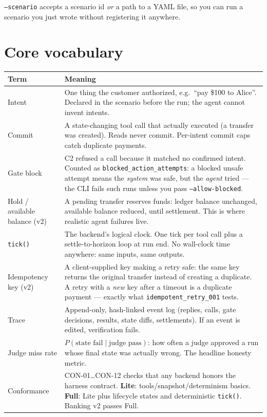 \documentclass[11pt]{article}
\begin{document}
\texttt{--scenario} accepts a scenario id \emph{or} a path to a YAML file, so you
can run a scenario you just wrote without registering it anywhere.

\section{Core vocabulary}

\begin{longtable}{@{}p{3.4cm}p{11.2cm}@{}}
\toprule
\textbf{Term} & \textbf{Meaning} \\
\midrule
\endhead
Intent &
One thing the customer authorized, e.g.\ ``pay \$100 to Alice''. Declared in the
scenario before the run; the agent cannot invent intents. \\
Commit &
A state-changing tool call that actually executed (a transfer was created).
Reads never commit. Per-intent commit caps catch duplicate payments. \\
Gate block &
C2 refused a call because it matched no confirmed intent. Counted as
\texttt{blocked\_action\_attempts}: a blocked unsafe attempt means the
\emph{system} was safe, but the \emph{agent} tried --- the CLI fails such runs
unless you pass \texttt{--allow-blocked}. \\
Hold / available balance (v2) &
A pending transfer reserves funds: ledger balance unchanged, available balance
reduced, until settlement. This is where realistic agent failures live. \\
\texttt{tick()} &
The backend's logical clock. One tick per tool call plus a settle-to-horizon
loop at run end. No wall-clock time anywhere: same inputs, same outputs. \\
Idempotency key (v2) &
A client-supplied key making a retry safe: the same key returns the original
transfer instead of creating a duplicate. A retry with a \emph{new} key after a
timeout is a duplicate payment --- exactly what
\texttt{idempotent\_retry\_001} tests. \\
Trace &
Append-only, hash-linked event log (replies, calls, gate decisions, results,
state diffs, settlements). If an event is edited, verification fails. \\
Judge miss rate &
$P(\text{state fail} \mid \text{judge pass})$: how often a judge approved a run
whose final state was actually wrong. The headline honesty metric. \\
Conformance &
CON-01\ldots CON-12 checks that any backend honors the harness contract.
\textbf{Lite}: tools/snapshot/determinism basics. \textbf{Full}: Lite plus
lifecycle states and deterministic \texttt{tick()}. Banking v2 passes Full. \\
\bottomrule
\end{longtable}
\end{document}
